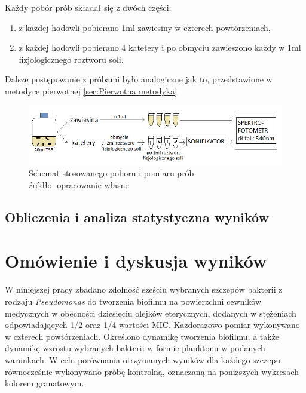 \documentclass[11pt,a4paper]{report}
\begin{document}
Każdy pobór prób składał się z dwóch części:
\begin{enumerate}
\item z każdej hodowli pobierano 1ml zawiesiny w czterech powtórzeniach,
\item z każdej hodowli pobierano 4 katetery i po obmyciu zawieszono każdy w 1ml fizjologicznego roztworu soli.
\end{enumerate}

Dalsze postępowanie z próbami było analogiczne jak to, przedstawione w metodyce pierwotnej \autoref{sec:Pierwotna metodyka}

\begin{figure}[!h]

\begin{center}
\includegraphics[scale=0.75]{img/pomiar.png}
\caption{Schemat stosowanego poboru i pomiaru prób\\
źródło: opracowanie własne}\label{pomiar}
\end{center} 
\end{figure}

\section{Obliczenia i analiza statystyczna wyników}


\chapter{Omówienie i dyskusja wyników}

%
%
%
W niniejszej pracy zbadano zdolność sześciu wybranych szczepów bakterii z rodzaju \textit{Pseudomonas} do tworzenia biofilmu na powierzchni cewników medycznych w obecności dziesięciu olejków eterycznych, dodanych w stężeniach odpowiadających 1/2 oraz 1/4 wartości MIC. Każdorazowo pomiar wykonywano w czterech powtórzeniach.
Określono dynamikę tworzenia biofilmu, a także dynamikę wzrostu wybranych bakterii w formie planktonu w podanych warunkach.
W celu porównania otrzymanych wyników dla każdego szczepu równocześnie wykonywano próbę kontrolną, oznaczaną na poniższych wykresach kolorem granatowym.
\end{document}
